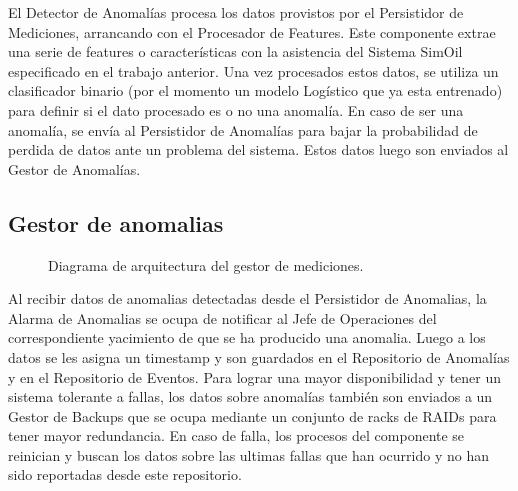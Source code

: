 \documentclass{article}
\theoremstyle{definition}
\theoremstyle{remark}
\begin{document}
El Detector de Anomalías procesa los datos provistos por el Persistidor de Mediciones, arrancando con el Procesador de Features. Este componente extrae una serie de features o características con la asistencia del Sistema SimOil especificado en el trabajo anterior. Una vez procesados estos datos, se utiliza un clasificador binario (por el momento un modelo Logístico que ya esta entrenado) para definir si el dato procesado es o no una anomalía. En caso de ser una anomalía, se envía al Persistidor de Anomalías para bajar la probabilidad de perdida de datos ante un problema del sistema. Estos datos luego son enviados al Gestor de Anomalías.

\subsection{Gestor de anomalias} \label{gestor_anomalias}

\begin{figure}[H]
	\caption{Diagrama de arquitectura del gestor de mediciones.}
\end{figure}

Al recibir datos de anomalias detectadas desde el Persistidor de Anomalias, la Alarma de Anomalias se ocupa de notificar al Jefe de Operaciones del correspondiente yacimiento de que se ha producido una anomalia. Luego a los datos se les asigna un timestamp y son guardados en el Repositorio de Anomalías y en el Repositorio de Eventos. Para lograr una mayor disponibilidad y tener un sistema tolerante a fallas, los datos sobre anomalías también son enviados a un Gestor de Backups que se ocupa mediante un conjunto de racks de RAIDs para tener mayor redundancia. En caso de falla, los procesos del componente se reinician y buscan los datos sobre las ultimas fallas que han ocurrido y no han sido reportadas desde este repositorio.
\end{document}
